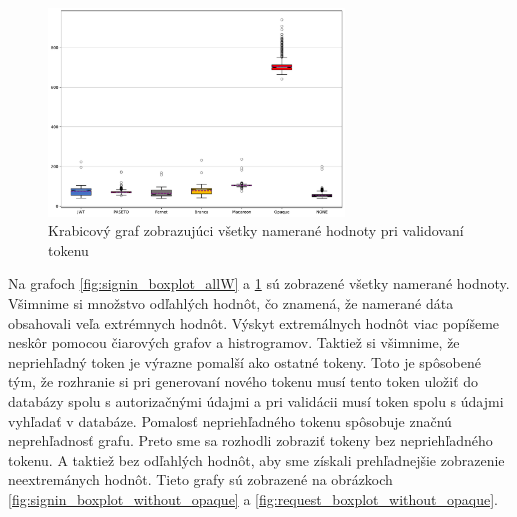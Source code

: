 \begin{figure}
  \centerline{\includegraphics[width=0.7\textwidth]{images/request_boxplot_allW}}
  \caption[Krabicový graf -- validácia, všetky hodnoty]{Krabicový graf zobrazujúci všetky namerané hodnoty pri validovaní tokenu}
  \label{fig:request_boxplot_allW}
\end{figure}

Na grafoch \ref{fig:signin_boxplot_allW} a \ref{fig:request_boxplot_allW} sú zobrazené všetky namerané hodnoty. Všimnime si množstvo odľahlých hodnôt, čo znamená, že namerané dáta obsahovali veľa extrémnych hodnôt. Výskyt extremálnych hodnôt viac popíšeme neskôr pomocou čiarových grafov a histrogramov. Taktiež si všimnime, že nepriehľadný token je výrazne pomalší ako ostatné tokeny. Toto je spôsobené tým, že rozhranie si pri generovaní nového tokenu musí tento token uložiť do databázy spolu s autorizačnými údajmi a pri validácii musí token spolu s údajmi vyhľadať v databáze. Pomalosť nepriehľadného tokenu spôsobuje značnú neprehľadnosť grafu. Preto sme sa rozhodli zobraziť tokeny bez nepriehľadného tokenu. A taktiež bez odľahlých hodnôt, aby sme získali prehľadnejšie zobrazenie neextremánych hodnôt. Tieto grafy sú zobrazené na obrázkoch \ref{fig:signin_boxplot_without_opaque} a \ref{fig:request_boxplot_without_opaque}.

